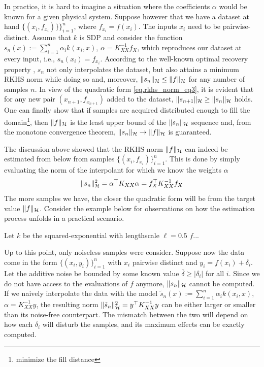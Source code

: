 In practice, it is hard to imagine a situation where the coefficients $\alpha$ would be known for a given physical system. Suppose however that we have a dataset at hand $\{(x_i,f_{x_i})\}\}_{i=1}^n$, where $f_{x_i} = f(x_i)$. The inputs $x_i$ need to be pairwise-distinct. Assume that $k$ is SDP and consider the function $s_n(x) := \sum_{i=1}^n \alpha_i k(x_i,x)$, $\alpha = K_{XX}^{-1} f_X$, which reproduces our dataset at every input, i.e., $s_n(x_i) = f_{x_i}$. According to the well-known optimal recovery property \cite[§8.3]{iske2018approximation}, $s_n$ not only interpolates the dataset, but also attains a minimum RKHS norm while doing so and, moreover, $\Vert s_n \Vert_{\mathcal{H}} \leq \Vert f \Vert_{\mathcal{H}}$ for any number of samples $n$. In view of the quadratic form \eqref{eq.rkhs_norm_eq3}, it is evident that for any new pair $(x_{n+1},f_{x_{n+1}})$ added to the dataset, $\Vert s_{n+1} \Vert_{\mathcal{H}} \geq \Vert s_n \Vert_{\mathcal{H}}$ holds. One can finally show that if samples are acquired distributed enough to fill the domain\footnote{minimize the fill distance}, then $\Vert f \Vert_{\mathcal{H}}$ is the least upper bound of the $\Vert s_n \Vert_{\mathcal{H}}$ sequence and, from the monotone convergence theorem, $\Vert s_n \Vert_{\mathcal{H}} \rightarrow \Vert f \Vert_{\mathcal{H}}$ is guaranteed.

The discussion above showed that the RKHS norm $\Vert f \Vert_{\mathcal{H}}$ can indeed be estimated from below from samples $\{(x_i,f_{x_i})\}_{i=1}^n$. This is done by simply evaluating the norm of the interpolant for which we know the weights $\alpha$
\begin{equation}
\Vert s_n \Vert_{\mathcal{H}}^2 = \alpha^\top K_{XX} \alpha = f_{X}^\top K_{XX}^{-1} f_{X}
\end{equation}
The more samples we have, the closer the quadratic form will be from the target value $\Vert f \Vert_{\mathcal{H}}$. Consider the example below for observations on how the estimation process unfolds in a practical scenario.

Let $k$ be the squared-exponential with lengthscale $\ell = 0.5$ $f$...

Up to this point, only noiseless samples were consider. Suppose now the data come in the form $\{(x_i,y_i)\}_{i=1}^n$ with $x_i$ pairwise distinct and $y_i=f(x_i) + \delta_i$. Let the additive noise be bounded by some known value $\bar \delta \geq |\delta_i|$ for all $i$. Since we do not have access to the evaluations of $f$ anymore, $\Vert s_n \Vert_{\mathcal{H}}$ cannot be computed. If we naively interpolate the data with the model $\tilde s_n(x) := \sum_{i=1}^n \alpha_i k(x_i,x)$, $\alpha = K_{XX}^{-1} y$, the resulting norm $\Vert \tilde s_n \Vert_{\mathcal{H}}^2 = y^\top K_{XX}^{-1}y$ can be either larger or smaller than its noise-free counterpart. The mismatch between the two will depend on how each $\delta_i$ will disturb the samples, and its maximum effects can be exactly computed.

